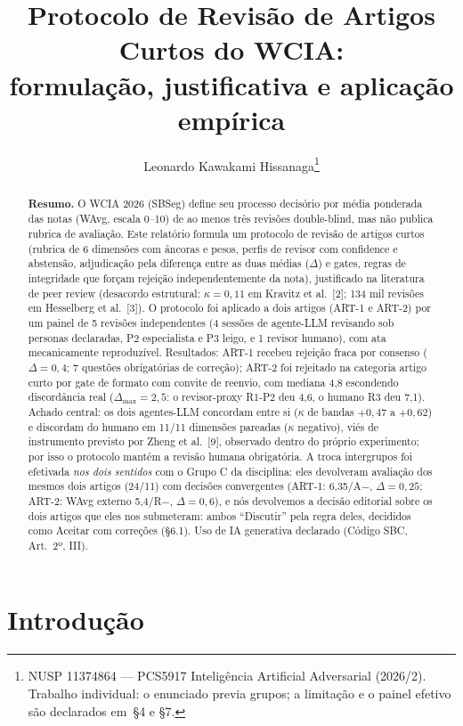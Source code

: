 \documentclass[10pt,a4paper,twocolumn]{article}
\title{\textbf{Protocolo de Revisão de Artigos Curtos do WCIA:\\ formulação, justificativa e aplicação empírica}}
\author{Leonardo Kawakami Hissanaga\footnote{NUSP 11374864 --- PCS5917 Inteligência Artificial Adversarial (2026/2). Trabalho individual: o enunciado previa grupos; a limitação e o painel efetivo são declarados em~\S4 e \S7.}}
\date{}
\begin{document}
\maketitle

\begin{abstract}
\noindent\textbf{Resumo.} O WCIA 2026 (SBSeg) define seu processo decisório por média ponderada das notas (WAvg, escala 0--10) de ao menos três revisões double-blind, mas não publica rubrica de avaliação. Este relatório formula um protocolo de revisão de artigos curtos (rubrica de 6 dimensões com âncoras e pesos, perfis de revisor com confidence e abstensão, adjudicação pela diferença entre as duas médias ($\Delta$) e gates, regras de integridade que forçam rejeição independentemente da nota), justificado na literatura de peer review (desacordo estrutural: $\kappa = 0{,}11$ em Kravitz et al.\ [2]; 134 mil revisões em Hesselberg et al.\ [3]). O protocolo foi aplicado a dois artigos (ART-1 e ART-2) por um painel de 5 revisões independentes (4 sessões de agente-LLM revisando sob personas declaradas, P2 especialista e P3 leigo, e 1 revisor humano), com ata mecanicamente reproduzível. Resultados: ART-1 recebeu rejeição fraca por consenso ($\Delta = 0{,}4$; 7 questões obrigatórias de correção); ART-2 foi rejeitado na categoria artigo curto por gate de formato com convite de reenvio, com mediana 4,8 escondendo discordância real ($\Delta_{\max} = 2{,}5$: o revisor-proxy R1-P2 deu 4,6, o humano R3 deu 7,1). Achado central: os dois agentes-LLM concordam entre si ($\kappa$ de bandas $+0{,}47$ a $+0{,}62$) e discordam do humano em 11/11 dimensões pareadas ($\kappa$ negativo), viés de instrumento previsto por Zheng et al.\ [9], observado dentro do próprio experimento; por isso o protocolo mantém a revisão humana obrigatória. A troca intergrupos foi efetivada \emph{nos dois sentidos} com o Grupo C da disciplina: eles devolveram avaliação dos mesmos dois artigos (24/11) com decisões convergentes (ART-1: 6,35/A$-$, $\Delta = 0{,}25$; ART-2: WAvg externo 5,4/R$-$, $\Delta = 0{,}6$), e nós devolvemos a decisão editorial sobre os dois artigos que eles nos submeteram: ambos ``Discutir'' pela regra deles, decididos como Aceitar com correções (\S6.1). Uso de IA generativa declarado (Código SBC, Art.\ 2º, III).
\end{abstract}

\section{Introdução}
\end{document}

